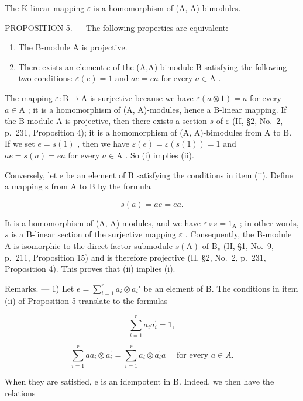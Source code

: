 The K-linear mapping \(\varepsilon\) is a homomorphism of (A, A)-bimodules.

PROPOSITION 5. --- The following properties are equivalent:

\begin{enumerate}
\def\labelenumi{(\roman{enumi})}
\item
  The B-module A is projective.
\item
  There exists an element \(e\) of the (A,A)-bimodule B satisfying the following two conditions: \(\varepsilon(e) = 1\) and \(ae = ea\) for every \(a \in \mathrm{A}\) .
\end{enumerate}

The mapping \(\varepsilon: \mathrm{B} \to \mathrm{A}\) is surjective because we have \(\varepsilon(a \otimes 1) = a\) for every \(a \in \mathrm{A}\) ; it is a homomorphism of (A, A)-modules, hence a B-linear mapping. If the B-module A is projective, then there exists a section \(s\) of \(\varepsilon\) (II, §2, No.~2, p.~231, Proposition 4); it is a homomorphism of (A, A)-bimodules from A to B. If we set \(e = s(1)\) , then we have \(\varepsilon(e) = \varepsilon(s(1)) = 1\) and \(ae = s(a) = ea\) for every \(a \in \mathrm{A}\) . So (i) implies (ii).

Conversely, let e be an element of B satisfying the conditions in item (ii). Define a mapping s from A to B by the formula

\[
s (a) = a e = e a.\tag{1}
\]

It is a homomorphism of (A, A)-modules, and we have \(\varepsilon \circ s = 1_{\mathrm{A}}\) ; in other words, \(s\) is a B-linear section of the surjective mapping \(\varepsilon\) . Consequently, the B-module A is isomorphic to the direct factor submodule \(s(\mathrm{A})\) of \(\mathrm{B}_s\) (II, §1, No.~9, p.~211, Proposition 15) and is therefore projective (II, §2, No.~2, p.~231, Proposition 4). This proves that (ii) implies (i).

Remarks. --- 1) Let \(e = \sum_{i=1}^{r} a_i \otimes a_i'\) be an element of B. The conditions in item (ii) of Proposition 5 translate to the formulas

\[
\sum_ {i = 1} ^ {r} a _ {i} a _ {i} ^ {\prime} = 1,\tag{2}
\]

\[
\sum_ {i = 1} ^ {r} a a _ {i} \otimes a _ {i} ^ {\prime} = \sum_ {i = 1} ^ {r} a _ {i} \otimes a _ {i} ^ {\prime} a \quad \text { for   every } a \in A.\tag{3}
\]

When they are satisfied, e is an idempotent in B. Indeed, we then have the relations

